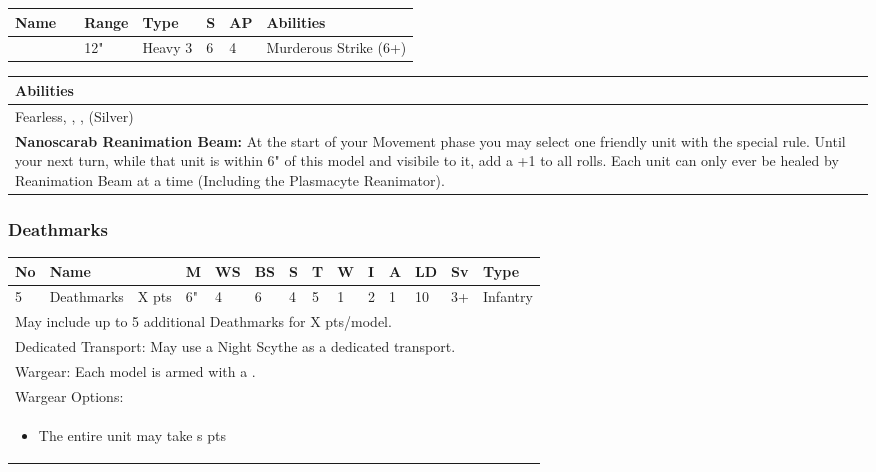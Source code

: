 \noindent
\begin{tabular}{||m{110pt} m{30pt} m{31pt} m{55pt} m{12pt} m{12pt} m{210pt}||}
	\hline
	Name & & Range & Type & S & AP & Abilities \\
	\hline
	\quickref{Atomiser Beam Lance} & & 12" & Heavy 3 & 6 & 4 & Murderous Strike (6+) \\
	\hline
\end{tabular}

\noindent
\begin{tabular}{||m{532pt}||}
	\hline
	Abilities \\
	\hline
	Fearless, \quickref{Living Metal}, \quickref{Reanimation Protocols}, \quickref{Soulless Hordes} (Silver) \\
	\textbf{Nanoscarab Reanimation Beam:} At the start of your Movement phase you may select one friendly unit with the \quickref{Reanimation Protocols} special rule. Until your next turn, while that unit is within 6" of this model and visibile to it, add a +1 to all \quickref{Reanimation Protocols} rolls. Each unit can only ever be healed by Reanimation Beam at a time (Including the Plasmacyte Reanimator). \\ 
	\hline
\end{tabular}




\newpage
\subsubsection{Deathmarks}

\noindent
\begin{tabular}{||m{10pt} m{95pt} m{30pt} m{11pt} m{11pt} m{11pt} m{11pt} m{11pt} m{11pt} m{11pt} m{11pt} m{11pt} m{11pt} m{125pt}||}
	\hline
	No & Name & & M & WS & BS & S & T & W & I & A & LD & Sv & Type \\
	\hline
	5 & Deathmarks & X pts & 6" & 4 & 6 & 4 & 5 & 1 & 2 & 1 & 10 & 3+ & Infantry \\
	\hline
	\hline
	\multicolumn{14}{||Z{532 pt}||}{May include up to 5 additional Deathmarks for X pts/model.}\\	
	\multicolumn{14}{||Z{532 pt}||}{Dedicated Transport: May use a Night Scythe as a dedicated transport.}\\
	\hline
	\hline
	\multicolumn{14}{||Z{532 pt}||}{Wargear: Each model is armed with a \quickref{Synaptic Disnitegrator}.} \\
	\multicolumn{14}{||Z{532 pt}||}{Wargear Options:} \\	\multicolumn{14}{||Z{532 pt}||}{\begin{itemize}
			\item The entire unit may take \quickref{Hyper-Oubliette Navigator}s \hrulefill 0 pts
	\end{itemize}} \\
	\hline
\end{tabular}


